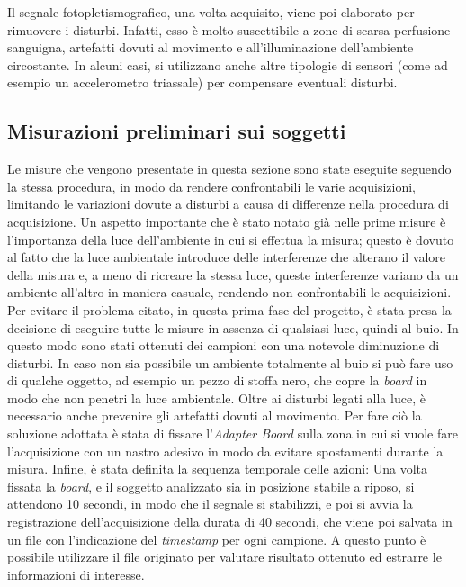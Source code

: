 Il segnale fotopletismografico, una volta acquisito, viene poi elaborato per rimuovere i disturbi. Infatti, esso è molto suscettibile a zone di scarsa perfusione sanguigna, artefatti dovuti al movimento e all'illuminazione dell'ambiente circostante. In alcuni casi, si utilizzano anche altre tipologie di sensori (come ad esempio un accelerometro triassale) per compensare eventuali disturbi.

\subsection{Misurazioni preliminari sui soggetti}
Le misure che vengono presentate in questa sezione sono state eseguite seguendo la stessa procedura, in modo da rendere confrontabili le varie acquisizioni, limitando le variazioni dovute a disturbi a causa di differenze nella procedura di acquisizione. Un aspetto importante che è stato notato già nelle prime misure è l'importanza della luce dell'ambiente in cui si effettua la misura; questo è dovuto al fatto che la luce ambientale introduce delle interferenze che alterano il valore della misura e, a meno di ricreare la stessa luce, queste interferenze variano da un ambiente all'altro in maniera casuale, rendendo non confrontabili le acquisizioni. Per evitare il problema citato, in questa prima fase del progetto, è stata presa la decisione di eseguire tutte le misure in assenza di qualsiasi luce, quindi al buio. In questo modo sono stati ottenuti dei campioni con una notevole diminuzione di disturbi. In caso non sia possibile un ambiente totalmente al buio si può fare uso di qualche oggetto, ad esempio un pezzo di stoffa nero, che copre la \textit{board} in modo che non penetri la luce ambientale.
Oltre ai disturbi legati alla luce, è necessario anche prevenire gli artefatti dovuti al movimento. Per fare ciò la soluzione adottata è stata di fissare l'\textit{Adapter Board} sulla zona in cui si vuole fare l'acquisizione con un nastro adesivo in modo da evitare spostamenti durante la misura.
Infine, è stata definita la sequenza temporale delle azioni: Una volta fissata la \textit{board}, e il soggetto analizzato sia in posizione stabile a riposo, si attendono 10 secondi, in modo che il segnale si stabilizzi, e poi si avvia la registrazione dell'acquisizione della durata di 40 secondi, che viene poi salvata in un file con l'indicazione del \textit{timestamp} per ogni campione. A questo punto è possibile utilizzare il file originato per valutare risultato ottenuto ed estrarre le informazioni di interesse.



